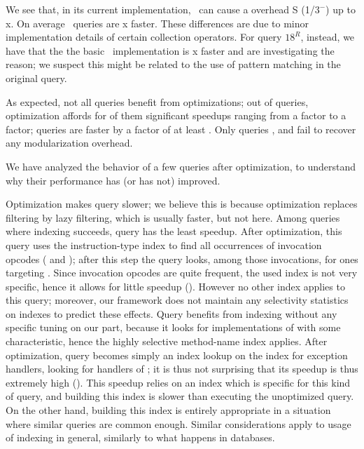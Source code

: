 We see that, in its current implementation, \LoS\ can cause a overhead S
(1/$3^-$) up to \maxInterpOver{}x. On average \LoS\ queries are
\geoMeanInterpOver{}x faster. These differences are due to minor implementation
details of certain collection operators.
For query $18^R$, instead, we have that the the basic \LoS\ implementation is \maxInvInterpOver{}x faster and are investigating the reason; we suspect this might be related to the use of pattern matching in the original query.

As expected, not all queries benefit from optimizations;
out of \queryCount{} queries, optimization affords for \nSpeededUpQueries{} of them significant speedups ranging from a \minOptimSpeedup{} factor to a \maxOptimSpeedup{} factor; \nBigSpeededUpQueries{} queries are faster by a factor of at least \speedupBigThreshold{}.
Only queries \queryMSPKGPROTECT{}, \querySICINNERSHOULDBESTATICANON{} and \queryITAINEFFICIENTTOARRAY{} fail to recover any modularization overhead.

We have analyzed the behavior of a few queries after optimization, to understand why their performance has 
(or has not) improved.

Optimization makes query \querySEBADFIELDINNERCLASS{} slower; we believe this is because optimization replaces filtering by lazy filtering, which is usually faster, but not here.
Among queries where indexing succeeds, query \queryGCCALL{} has the least speedup. After optimization, this query uses the instruction-type index to find all occurrences of invocation opcodes ( and ); after this step the query looks, among those invocations, for ones targeting . Since invocation opcodes are quite frequent, the used index is not very specific, hence it allows for little speedup (\speedupTGCCALL). However no other index applies to this query; moreover, our framework does not maintain any selectivity statistics on indexes to predict these effects.
Query \queryFIUSELESS{} benefits from indexing without any specific tuning on our part, because it looks for implementations of  with some characteristic, hence the highly selective method-name index applies.
After optimization, query \queryDONTCATCHIMSE{} becomes simply an index lookup on the index for exception handlers, looking for handlers of ; it is thus not surprising that its speedup is thus extremely high (\maxOptimSpeedup{}). This speedup relies on an index which is specific for this kind of query, and building this index is slower than executing the unoptimized query. On the other hand, building this index is entirely appropriate in a situation where similar queries are common enough. Similar considerations apply to usage of indexing in general, similarly to what happens in databases.

